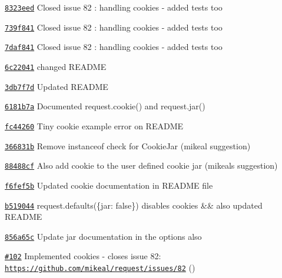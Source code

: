\begin{DoxyItemize}
\item \href{https://github.com/mikeal/request/commit/8323eed4915bb73b33544bc276f3840c13969134}{\tt 8323eed} Closed issue 82 \+: handling cookies -\/ added tests too
\item \href{https://github.com/mikeal/request/commit/739f84166d619778ab96fd0b0f4f1f43e8b0fdda}{\tt 739f841} Closed issue 82 \+: handling cookies -\/ added tests too
\item \href{https://github.com/mikeal/request/commit/7daf8415fb1a4e707ec54eb413169e49d8bbe521}{\tt 7daf841} Closed issue 82 \+: handling cookies -\/ added tests too
\item \href{https://github.com/mikeal/request/commit/6c22041a4719bf081c827dda8f35e7b79b4c39d9}{\tt 6c22041} changed R\+E\+A\+D\+M\+E
\item \href{https://github.com/mikeal/request/commit/3db7f7d38e95406b84f06fed52b69038b0250904}{\tt 3db7f7d} Updated R\+E\+A\+D\+M\+E
\item \href{https://github.com/mikeal/request/commit/6181b7a8a4be75bcf75cd3ff6dacb8e910737e92}{\tt 6181b7a} Documented request.\+cookie() and request.\+jar()
\item \href{https://github.com/mikeal/request/commit/fc44260d13f0094bfe96d18878a11c6fe88b69e5}{\tt fc44260} Tiny cookie example error on R\+E\+A\+D\+M\+E
\item \href{https://github.com/mikeal/request/commit/366831b705b5d5ebfbec5f63b4b140cbafcb4515}{\tt 366831b} Remove instanceof check for Cookie\+Jar (mikeal suggestion)
\item \href{https://github.com/mikeal/request/commit/88488cf076efbd916b0326e0981e280c993963a7}{\tt 88488cf} Also add cookie to the user defined cookie jar (mikeal\textquotesingle{}s suggestion)
\item \href{https://github.com/mikeal/request/commit/f6fef5bfa4ba8e1dfa3022df8991716e5cba7264}{\tt f6fef5b} Updated cookie documentation in R\+E\+A\+D\+M\+E file
\item \href{https://github.com/mikeal/request/commit/b5190441a889164dfeb4148fac643fd7a87cfb51}{\tt b519044} request.\+defaults(\{jar\+: false\}) disables cookies \&\& also updated R\+E\+A\+D\+M\+E
\item \href{https://github.com/mikeal/request/commit/856a65cd28402efbe3831a68d73937564a27ea9b}{\tt 856a65c} Update jar documentation in the options also
\item \href{https://github.com/mikeal/request/pull/102}{\tt \#102} Implemented cookies -\/ closes issue 82\+: \href{https://github.com/mikeal/request/issues/82}{\tt https\+://github.\+com/mikeal/request/issues/82} ()

\end{DoxyItemize}
